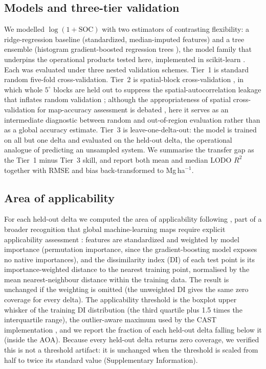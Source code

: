 \documentclass[twocolumn,9pt]{extarticle}
\begin{document}
\subsection*{Models and three-tier validation}
We modelled $\log(1+\mathrm{SOC})$ with two estimators of contrasting flexibility: a
ridge-regression baseline (standardized, median-imputed features) and a tree ensemble
(histogram gradient-boosted regression trees \cite{breiman2001,ke2017lightgbm}), the
model family that underpins the operational products tested here, implemented in
scikit-learn \cite{pedregosa2011}. Each was evaluated under three nested validation schemes. Tier~1
is standard random five-fold cross-validation. Tier~2 is spatial-block cross-validation
\cite{roberts2017}, in which whole $5^\circ$ blocks are held out to suppress the
spatial-autocorrelation leakage that inflates random validation \cite{ploton2020};
although the appropriateness of spatial cross-validation for map-accuracy assessment is
debated \cite{wadoux2021}, here it serves as an intermediate diagnostic between random
and out-of-region evaluation rather than as a global accuracy estimate. Tier~3 is
leave-one-delta-out: the model is trained on all but one delta and evaluated on the
held-out delta, the operational analogue of predicting an unsampled system. We summarise the transfer gap as the Tier~1 minus Tier~3 skill, and
report both mean and median LODO $R^2$ together with RMSE and bias back-transformed to
Mg\,ha$^{-1}$.

\subsection*{Area of applicability}
For each held-out delta we computed the area of applicability following
\cite{meyer2021}, part of a broader recognition that global machine-learning maps
require explicit applicability assessment \cite{meyer2022}: features are standardized
and weighted by model importance (permutation importance, since the gradient-boosting
model exposes no native importances), and the dissimilarity index (DI) of each test point
is its importance-weighted distance to the nearest training point, normalised by the mean
nearest-neighbour distance within the training data. The result is unchanged if the
weighting is omitted (the unweighted DI gives the same zero coverage for every delta). The applicability threshold is the boxplot upper whisker of the training
DI distribution (the third quartile plus 1.5 times the interquartile range), the
outlier-aware maximum used by the CAST implementation \cite{meyer2021}, and we report
the fraction of each held-out delta falling below it (inside the AOA). Because every
held-out delta returns zero coverage, we verified this is not a threshold artifact: it
is unchanged when the threshold is scaled from half to twice its standard value
(Supplementary Information).
\end{document}
